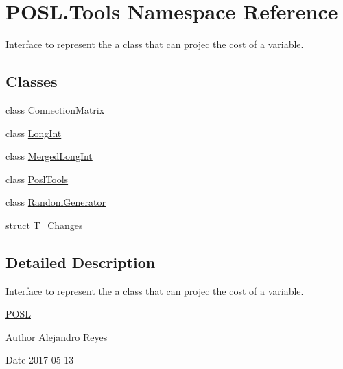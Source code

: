 \hypertarget{namespacePOSL_1_1Tools}{}\section{P\+O\+S\+L.\+Tools Namespace Reference}
\label{namespacePOSL_1_1Tools}


Interface to represent the a class that can projec the cost of a variable.  


\subsection*{Classes}
\begin{DoxyCompactItemize}
\item 
class \hyperlink{classPOSL_1_1Tools_1_1ConnectionMatrix}{Connection\+Matrix}
\item 
class \hyperlink{classPOSL_1_1Tools_1_1LongInt}{Long\+Int}
\item 
class \hyperlink{classPOSL_1_1Tools_1_1MergedLongInt}{Merged\+Long\+Int}
\item 
class \hyperlink{classPOSL_1_1Tools_1_1PoslTools}{Posl\+Tools}
\item 
class \hyperlink{classPOSL_1_1Tools_1_1RandomGenerator}{Random\+Generator}
\item 
struct \hyperlink{structPOSL_1_1Tools_1_1T__Changes}{T\+\_\+\+Changes}
\end{DoxyCompactItemize}


\subsection{Detailed Description}
Interface to represent the a class that can projec the cost of a variable. 

\hyperlink{namespacePOSL}{P\+O\+SL}

\begin{DoxyAuthor}{Author}
Alejandro Reyes 
\end{DoxyAuthor}
\begin{DoxyDate}{Date}
2017-\/05-\/13 
\end{DoxyDate}
